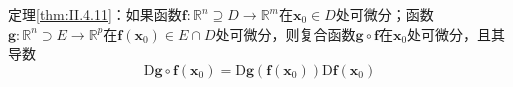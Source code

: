 \documentclass[../main.tex]{subfiles}
\begin{document}
\begin{theorem*}
    定理\ref{thm:II.4.11}：如果函数$\mathbf{f}:\mathbb{R}^n\supseteq D\rightarrow\mathbb{R}^m$在$\mathbf{x}_0\in D$处可微分；函数$\mathbf{g}:\mathbb{R}^n\supset E\rightarrow\mathbb{R}^p$在$\mathbf{f}\left(\mathbf{x}_0\right)\in E\cap D$处可微分，则复合函数$\mathbf{g}\circ\mathbf{f}$在$\mathbf{x}_0$处可微分，且其导数
    \[\mathrm{D}\mathbf{g}\circ\mathbf{f}\left(\mathbf{x}_0\right)=\mathrm{D}\mathbf{g}\left(\mathbf{f}\left(\mathbf{x}_0\right)\right)\mathrm{D}\mathbf{f}\left(\mathbf{x}_0 \right)\]
\end{theorem*}
\end{document}

